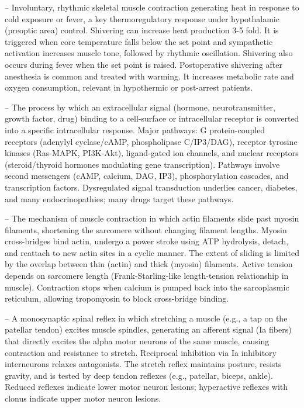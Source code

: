 -- Involuntary, rhythmic skeletal muscle contraction generating heat in response to cold exposure or fever, a key thermoregulatory response under hypothalamic (preoptic area) control. Shivering can increase heat production 3-5 fold. It is triggered when core temperature falls below the set point and sympathetic activation increases muscle tone, followed by rhythmic oscillation. Shivering also occurs during fever when the set point is raised. Postoperative shivering after anesthesia is common and treated with warming. It increases metabolic rate and oxygen consumption, relevant in hypothermic or post-arrest patients.

-- The process by which an extracellular signal (hormone, neurotransmitter, growth factor, drug) binding to a cell-surface or intracellular receptor is converted into a specific intracellular response. Major pathways: G protein-coupled receptors (adenylyl cyclase/cAMP, phospholipase C/IP3/DAG), receptor tyrosine kinases (Ras-MAPK, PI3K-Akt), ligand-gated ion channels, and nuclear receptors (steroid/thyroid hormones modulating gene transcription). Pathways involve second messengers (cAMP, calcium, DAG, IP3), phosphorylation cascades, and transcription factors. Dysregulated signal transduction underlies cancer, diabetes, and many endocrinopathies; many drugs target these pathways.

-- The mechanism of muscle contraction in which actin filaments slide past myosin filaments, shortening the sarcomere without changing filament lengths. Myosin cross-bridges bind actin, undergo a power stroke using ATP hydrolysis, detach, and reattach to new actin sites in a cyclic manner. The extent of sliding is limited by the overlap between thin (actin) and thick (myosin) filaments. Active tension depends on sarcomere length (Frank-Starling-like length-tension relationship in muscle). Contraction stops when calcium is pumped back into the sarcoplasmic reticulum, allowing tropomyosin to block cross-bridge binding.

-- A monosynaptic spinal reflex in which stretching a muscle (e.g., a tap on the patellar tendon) excites muscle spindles, generating an afferent signal (Ia fibers) that directly excites the alpha motor neurons of the same muscle, causing contraction and resistance to stretch. Reciprocal inhibition via Ia inhibitory interneurons relaxes antagonists. The stretch reflex maintains posture, resists gravity, and is tested by deep tendon reflexes (e.g., patellar, biceps, ankle). Reduced reflexes indicate lower motor neuron lesions; hyperactive reflexes with clonus indicate upper motor neuron lesions.

